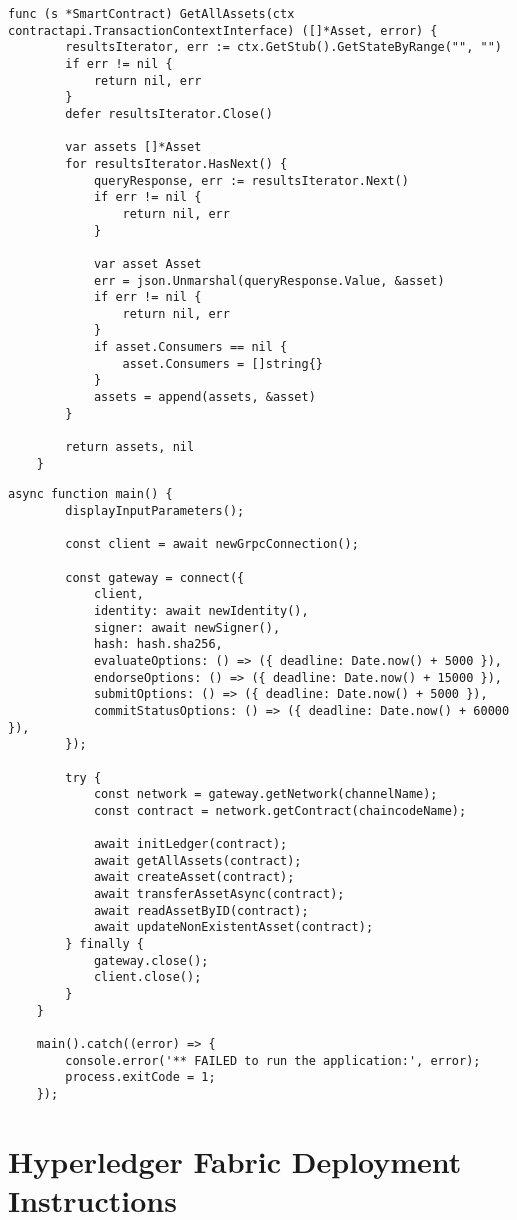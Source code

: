 \begin{lstlisting}[style=customjs, caption={GetAllAssets Function}, label={lst:get-all-assets}]
	func (s *SmartContract) GetAllAssets(ctx contractapi.TransactionContextInterface) ([]*Asset, error) {
		resultsIterator, err := ctx.GetStub().GetStateByRange("", "")
		if err != nil {
			return nil, err
		}
		defer resultsIterator.Close()
		
		var assets []*Asset
		for resultsIterator.HasNext() {
			queryResponse, err := resultsIterator.Next()
			if err != nil {
				return nil, err
			}
			
			var asset Asset
			err = json.Unmarshal(queryResponse.Value, &asset)
			if err != nil {
				return nil, err
			}
			if asset.Consumers == nil {
				asset.Consumers = []string{}
			}
			assets = append(assets, &asset)
		}
		
		return assets, nil
	}
\end{lstlisting}


\begin{lstlisting}[style=customjs, caption={\texttt{main()} Function and Gateway Logic}, label={lst:main-gateway}]
	async function main() {
		displayInputParameters();
		
		const client = await newGrpcConnection();
		
		const gateway = connect({
			client,
			identity: await newIdentity(),
			signer: await newSigner(),
			hash: hash.sha256,
			evaluateOptions: () => ({ deadline: Date.now() + 5000 }),
			endorseOptions: () => ({ deadline: Date.now() + 15000 }),
			submitOptions: () => ({ deadline: Date.now() + 5000 }),
			commitStatusOptions: () => ({ deadline: Date.now() + 60000 }),
		});
		
		try {
			const network = gateway.getNetwork(channelName);
			const contract = network.getContract(chaincodeName);
			
			await initLedger(contract);
			await getAllAssets(contract);
			await createAsset(contract);
			await transferAssetAsync(contract);
			await readAssetByID(contract);
			await updateNonExistentAsset(contract);
		} finally {
			gateway.close();
			client.close();
		}
	}
	
	main().catch((error) => {
		console.error('** FAILED to run the application:', error);
		process.exitCode = 1;
	});
\end{lstlisting}


\section{Hyperledger Fabric Deployment Instructions}
\label{sec:deployment}

